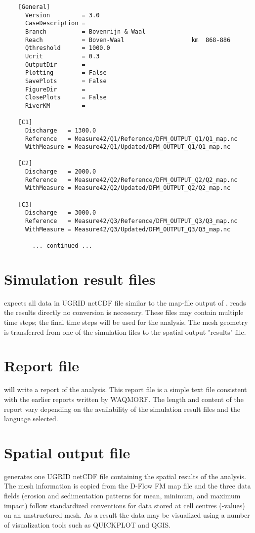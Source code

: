 \begin{Verbatim}
    [General]
      Version         = 3.0
      CaseDescription = 
      Branch          = Bovenrijn & Waal
      Reach           = Boven-Waal                   km  868-886
      Qthreshold      = 1000.0
      Ucrit           = 0.3
      OutputDir       = 
      Plotting        = False
      SavePlots       = False
      FigureDir       = 
      ClosePlots      = False
      RiverKM         = 
    
    [C1]
      Discharge   = 1300.0
      Reference   = Measure42/Q1/Reference/DFM_OUTPUT_Q1/Q1_map.nc
      WithMeasure = Measure42/Q1/Updated/DFM_OUTPUT_Q1/Q1_map.nc
    
    [C2]
      Discharge   = 2000.0
      Reference   = Measure42/Q2/Reference/DFM_OUTPUT_Q2/Q2_map.nc
      WithMeasure = Measure42/Q2/Updated/DFM_OUTPUT_Q2/Q2_map.nc
    
    [C3]
      Discharge   = 3000.0
      Reference   = Measure42/Q3/Reference/DFM_OUTPUT_Q3/Q3_map.nc
      WithMeasure = Measure42/Q3/Updated/DFM_OUTPUT_Q3/Q3_map.nc

        ... continued ...
\end{Verbatim}

\section{Simulation result files}

\dfastmi expects all data in UGRID netCDF file similar to the map-file output of \dflowfm.
\dfastmi reads the results directly no conversion is necessary.
These files may contain multiple time steps; the final time steps will be used for the analysis.
The mesh geometry is transferred from one of the simulation files to the \dfastmi spatial output "results" file.

\section{Report file}

\dfastmi will write a report of the analysis.
This report file is a simple text file consistent with the earlier reports written by WAQMORF.
The length and content of the report vary depending on the availability of the simulation result files and the language selected.


\section{Spatial output file}

\dfastmi generates one UGRID netCDF file containing the spatial results of the analysis.
The mesh information is copied from the D-Flow FM map file and the three data fields (erosion and sedimentation patterns for mean, minimum, and maximum impact) follow standardized conventions for data stored at cell centres (-values) on an unstructured mesh.
As a result the data may be visualized using a number of visualization tools such as QUICKPLOT and QGIS.
